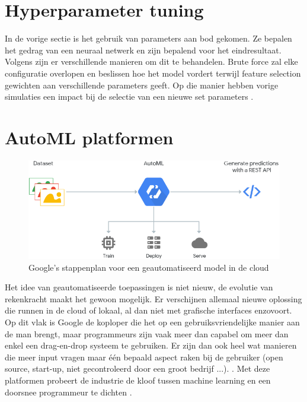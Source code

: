 \section{Hyperparameter tuning}

In de vorige sectie is het gebruik van parameters aan bod gekomen. Ze bepalen het gedrag van een neuraal netwerk en zijn bepalend voor het eindresultaat. Volgens \textcite{Brust2019} zijn er verschillende manieren om dit te behandelen. Brute force zal elke configuratie overlopen en beslissen hoe het model vordert terwijl feature selection gewichten aan verschillende parameters geeft. Op die manier hebben vorige simulaties een impact bij de selectie van een nieuwe set parameters \autocite{Claesen2015}.

\section{AutoML platformen}

\begin{figure}
    \includegraphics[width=\linewidth]{img/google-cloud-automl.png}
    \caption{Google's stappenplan voor een geautomatiseerd model in de cloud}
    \label{fig:google-cloud-automl}
\end{figure}

Het idee van geautomatiseerde toepassingen is niet nieuw, de evolutie van rekenkracht maakt het gewoon mogelijk. Er verschijnen allemaal nieuwe oplossing die runnen in de cloud of lokaal, al dan niet met grafische interfaces enzovoort. Op dit vlak is Google de koploper die het op een gebruiksvriendelijke manier aan de man brengt, maar programmeurs zijn vaak meer dan capabel om meer dan enkel een drag-en-drop systeem te gebruiken. Er zijn dan ook heel wat manieren die meer input vragen maar één bepaald aspect raken bij de gebruiker (open source, start-up, niet gecontroleerd door een groot bedrijf ...). . Met deze platformen probeert de industrie de kloof tussen machine learning en een doorsnee programmeur te dichten \autocite{Gutierrez2019}.

